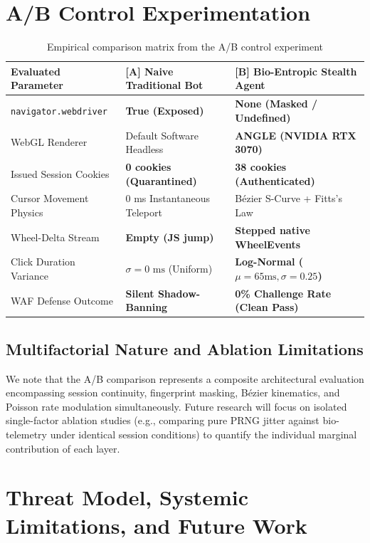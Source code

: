 \documentclass[11pt,a4paper]{article}
\begin{document}
\section{A/B Control Experimentation}

\begin{table}[h!]
\centering
\small
\begin{tabular}{p{4.2cm}p{4.2cm}p{4.8cm}}
\toprule
\textbf{Evaluated Parameter} & \textbf{[A] Naive Traditional Bot} & \textbf{[B] Bio-Entropic Stealth Agent} \\ \midrule
\texttt{navigator.webdriver} & \textcolor{secondary}{\textbf{True (Exposed)}} & \textcolor{primary}{\textbf{None (Masked / Undefined)}} \\
WebGL Renderer & Default Software Headless & \textbf{ANGLE (NVIDIA RTX 3070)} \\
Issued Session Cookies & \textcolor{secondary}{\textbf{0 cookies (Quarantined)}} & \textcolor{primary}{\textbf{38 cookies (Authenticated)}} \\
Cursor Movement Physics & 0 ms Instantaneous Teleport & Bézier S-Curve + Fitts's Law \\
Wheel-Delta Stream & \textcolor{secondary}{\textbf{Empty (JS jump)}} & \textcolor{primary}{\textbf{Stepped native WheelEvents}} \\
Click Duration Variance & $\sigma = 0\text{ ms}$ (Uniform) & \textbf{Log-Normal ($\mu=65\text{ms}, \sigma=0.25$)} \\
WAF Defense Outcome & \textbf{Silent Shadow-Banning} & \textbf{0\% Challenge Rate (Clean Pass)} \\ \bottomrule
\end{tabular}
\caption{Empirical comparison matrix from the A/B control experiment}
\end{table}

\subsection{Multifactorial Nature and Ablation Limitations}
We note that the A/B comparison represents a composite architectural evaluation encompassing session continuity, fingerprint masking, Bézier kinematics, and Poisson rate modulation simultaneously. Future research will focus on isolated single-factor ablation studies (e.g., comparing pure PRNG jitter against bio-telemetry under identical session conditions) to quantify the individual marginal contribution of each layer.

\section{Threat Model, Systemic Limitations, and Future Work}
\end{document}
